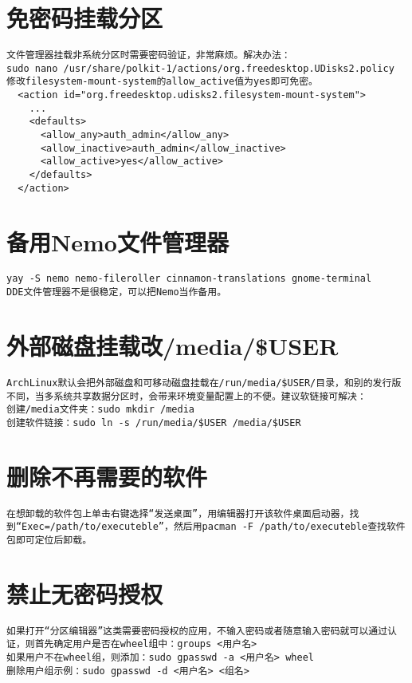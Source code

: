 \documentclass[a4paper,fontset=fandol,zihao=-4,linespread=1.2,oneside]{ctexbook}
\begin{document}
\section{免密码挂载分区} \label{section:nopass_mount}
\begin{lstlisting}
文件管理器挂载非系统分区时需要密码验证，非常麻烦。解决办法：
sudo nano /usr/share/polkit-1/actions/org.freedesktop.UDisks2.policy
修改filesystem-mount-system的allow_active值为yes即可免密。
  <action id="org.freedesktop.udisks2.filesystem-mount-system">
    ...
    <defaults>
      <allow_any>auth_admin</allow_any>
      <allow_inactive>auth_admin</allow_inactive>
      <allow_active>yes</allow_active>
    </defaults>
  </action>
\end{lstlisting}

\section{备用Nemo文件管理器}
\begin{lstlisting}
yay -S nemo nemo-fileroller cinnamon-translations gnome-terminal
DDE文件管理器不是很稳定，可以把Nemo当作备用。
\end{lstlisting}

\section{外部磁盘挂载改/media/\$USER}
\begin{lstlisting}
ArchLinux默认会把外部磁盘和可移动磁盘挂载在/run/media/$USER/目录，和别的发行版不同，当多系统共享数据分区时，会带来环境变量配置上的不便。建议软链接可解决：
创建/media文件夹：sudo mkdir /media
创建软件链接：sudo ln -s /run/media/$USER /media/$USER
\end{lstlisting}

\section{删除不再需要的软件}
\begin{lstlisting}
在想卸载的软件包上单击右键选择“发送桌面”，用编辑器打开该软件桌面启动器，找到“Exec=/path/to/executeble”，然后用pacman -F /path/to/executeble查找软件包即可定位后卸载。
\end{lstlisting}

\section{禁止无密码授权}
\begin{lstlisting}
如果打开“分区编辑器”这类需要密码授权的应用，不输入密码或者随意输入密码就可以通过认证，则首先确定用户是否在wheel组中：groups <用户名>
如果用户不在wheel组，则添加：sudo gpasswd -a <用户名> wheel
删除用户组示例：sudo gpasswd -d <用户名> <组名>
\end{lstlisting}
\end{document}
